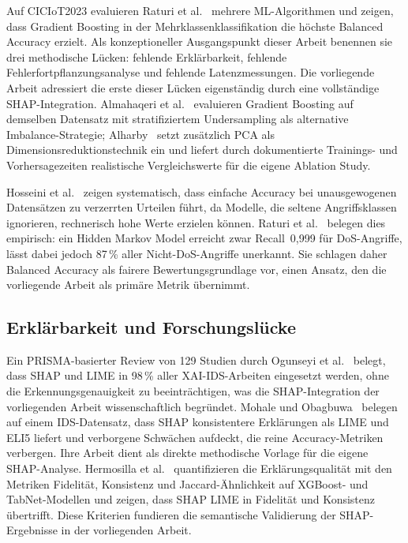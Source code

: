 \documentclass[letterpaper,twocolumn,10pt]{article}
\begin{document}
Auf CICIoT2023 evaluieren Raturi et al.~\cite{raturi2026exploratory}
mehrere ML-Algorithmen und zeigen, dass Gradient Boosting in der
Mehrklassenklassifikation die höchste Balanced Accuracy erzielt. Als
konzeptioneller Ausgangspunkt dieser Arbeit benennen sie drei
methodische Lücken: fehlende Erklärbarkeit, fehlende
Fehlerfortpflanzungsanalyse und fehlende Latenzmessungen. Die
vorliegende Arbeit adressiert die erste dieser Lücken eigenständig
durch eine vollständige SHAP-Integration. Almahaqeri et
al.~\cite{almahaqeri2026gradient} evaluieren Gradient Boosting auf
demselben Datensatz mit stratifiziertem Undersampling als alternative
Imbalance-Strategie; Alharby~\cite{alharby2025ciciot} setzt zusätzlich
PCA als Dimensionsreduktionstechnik ein und liefert durch dokumentierte
Trainings- und Vorhersagezeiten realistische Vergleichswerte für die
eigene Ablation Study.

Hosseini et al.~\cite{hosseini2025imbalance} zeigen systematisch, dass
einfache Accuracy bei unausgewogenen Datensätzen zu verzerrten Urteilen
führt, da Modelle, die seltene Angriffsklassen ignorieren, rechnerisch
hohe Werte erzielen können. Raturi et al.~\cite{raturi2026exploratory}
belegen dies empirisch: ein Hidden Markov Model erreicht zwar
Recall~0{,}999 für DoS-Angriffe, lässt dabei jedoch 87\,\% aller
Nicht-DoS-Angriffe unerkannt. Sie schlagen daher Balanced Accuracy als
fairere Bewertungsgrundlage vor, einen Ansatz, den die vorliegende
Arbeit als primäre Metrik übernimmt.

\subsection{Erklärbarkeit und Forschungslücke}

Ein PRISMA-basierter Review von 129 Studien durch Ogunseyi et
al.~\cite{ogunseyi2026xai_review} belegt, dass SHAP und LIME in
98\,\% aller XAI-IDS-Arbeiten eingesetzt werden, ohne die
Erkennungsgenauigkeit zu beeinträchtigen, was die SHAP-Integration der
vorliegenden Arbeit wissenschaftlich begründet. Mohale und
Obagbuwa~\cite{mohale2025xai} belegen auf einem IDS-Datensatz, dass
SHAP konsistentere Erklärungen als LIME und ELI5 liefert und verborgene
Schwächen aufdeckt, die reine Accuracy-Metriken verbergen. Ihre Arbeit
dient als direkte methodische Vorlage für die eigene SHAP-Analyse.
Hermosilla et al.~\cite{hermosilla2025xai_forensic} quantifizieren die
Erklärungsqualität mit den Metriken Fidelität, Konsistenz und
Jaccard-Ähnlichkeit auf XGBoost- und TabNet-Modellen und zeigen, dass
SHAP LIME in Fidelität und Konsistenz übertrifft. Diese Kriterien
fundieren die semantische Validierung der SHAP-Ergebnisse in der
vorliegenden Arbeit.
\end{document}
